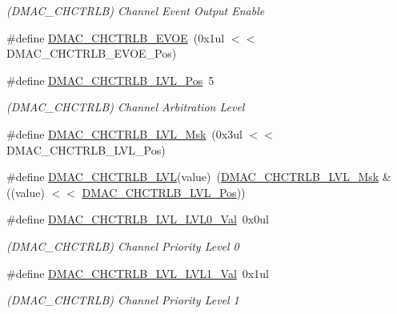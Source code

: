\begin{DoxyCompactItemize}
\begin{DoxyCompactList}\small\item\em (D\+M\+A\+C\+\_\+\+C\+H\+C\+T\+R\+LB) Channel Event Output Enable \end{DoxyCompactList}\item 
\#define \mbox{\hyperlink{group___s_a_m_d21___d_m_a_c_gae050cf0d770b987b351ac72f052d444c}{D\+M\+A\+C\+\_\+\+C\+H\+C\+T\+R\+L\+B\+\_\+\+E\+V\+OE}}~(0x1ul $<$$<$ D\+M\+A\+C\+\_\+\+C\+H\+C\+T\+R\+L\+B\+\_\+\+E\+V\+O\+E\+\_\+\+Pos)
\item 
\#define \mbox{\hyperlink{group___s_a_m_d21___d_m_a_c_ga4074cd8284b192e5d6fabcd787ced731}{D\+M\+A\+C\+\_\+\+C\+H\+C\+T\+R\+L\+B\+\_\+\+L\+V\+L\+\_\+\+Pos}}~5
\begin{DoxyCompactList}\small\item\em (D\+M\+A\+C\+\_\+\+C\+H\+C\+T\+R\+LB) Channel Arbitration Level \end{DoxyCompactList}\item 
\#define \mbox{\hyperlink{group___s_a_m_d21___d_m_a_c_ga9b4ec38104e2f4e3da42ea5a9e8bf48d}{D\+M\+A\+C\+\_\+\+C\+H\+C\+T\+R\+L\+B\+\_\+\+L\+V\+L\+\_\+\+Msk}}~(0x3ul $<$$<$ D\+M\+A\+C\+\_\+\+C\+H\+C\+T\+R\+L\+B\+\_\+\+L\+V\+L\+\_\+\+Pos)
\item 
\#define \mbox{\hyperlink{group___s_a_m_d21___d_m_a_c_ga22283c85cfcd7e68bf8f0f8ffef67dcc}{D\+M\+A\+C\+\_\+\+C\+H\+C\+T\+R\+L\+B\+\_\+\+L\+VL}}(value)~(\mbox{\hyperlink{group___s_a_m_d21___d_m_a_c_ga9b4ec38104e2f4e3da42ea5a9e8bf48d}{D\+M\+A\+C\+\_\+\+C\+H\+C\+T\+R\+L\+B\+\_\+\+L\+V\+L\+\_\+\+Msk}} \& ((value) $<$$<$ \mbox{\hyperlink{group___s_a_m_d21___d_m_a_c_ga4074cd8284b192e5d6fabcd787ced731}{D\+M\+A\+C\+\_\+\+C\+H\+C\+T\+R\+L\+B\+\_\+\+L\+V\+L\+\_\+\+Pos}}))
\item 
\#define \mbox{\hyperlink{group___s_a_m_d21___d_m_a_c_ga3bc4b38c45bb9fa91c9980302df45446}{D\+M\+A\+C\+\_\+\+C\+H\+C\+T\+R\+L\+B\+\_\+\+L\+V\+L\+\_\+\+L\+V\+L0\+\_\+\+Val}}~0x0ul
\begin{DoxyCompactList}\small\item\em (D\+M\+A\+C\+\_\+\+C\+H\+C\+T\+R\+LB) Channel Priority Level 0 \end{DoxyCompactList}\item 
\#define \mbox{\hyperlink{group___s_a_m_d21___d_m_a_c_ga24029501de374acf6f0679fc3fb3f26f}{D\+M\+A\+C\+\_\+\+C\+H\+C\+T\+R\+L\+B\+\_\+\+L\+V\+L\+\_\+\+L\+V\+L1\+\_\+\+Val}}~0x1ul
\begin{DoxyCompactList}\small\item\em (D\+M\+A\+C\+\_\+\+C\+H\+C\+T\+R\+LB) Channel Priority Level 1 \end{DoxyCompactList}\item 
$$
\end{DoxyCompactItemize}
